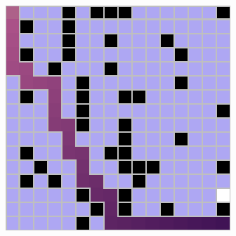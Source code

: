 \documentclass[letter]{article}
\begin{document}
\begin{questions}
\begin{figure}
		\caption{}\label{fig:q2-11}
		\endminipage\hfill
		\includegraphics[width=\linewidth]{../pics/16/BFS randomWalkPlus 113706 31 27898.png}
		\caption{}\label{fig:q2-12}
		\endminipage
	\end{figure}


\end{questions}
\end{document}
